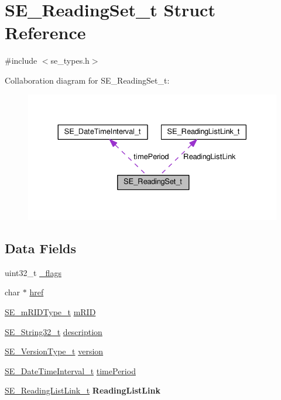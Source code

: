 \hypertarget{structSE__ReadingSet__t}{}\section{S\+E\+\_\+\+Reading\+Set\+\_\+t Struct Reference}
\label{structSE__ReadingSet__t}


{\ttfamily \#include $<$se\+\_\+types.\+h$>$}



Collaboration diagram for S\+E\+\_\+\+Reading\+Set\+\_\+t\+:\nopagebreak
\begin{figure}[H]
\begin{center}
\leavevmode
\includegraphics[width=330pt]{structSE__ReadingSet__t__coll__graph}
\end{center}
\end{figure}
\subsection*{Data Fields}
\begin{DoxyCompactItemize}
\item 
uint32\+\_\+t \hyperlink{group__ReadingSet_ga447ad86f7f9c278c2e3f166e89f6955c}{\+\_\+flags}
\item 
char $\ast$ \hyperlink{group__ReadingSet_gabdc2579f4df7fa4a87a23c41d057cf51}{href}
\item 
\hyperlink{group__mRIDType_gac74622112f3a388a2851b2289963ba5e}{S\+E\+\_\+m\+R\+I\+D\+Type\+\_\+t} \hyperlink{group__ReadingSet_gadeeb229d0f424fe8275177847d9764fb}{m\+R\+ID}
\item 
\hyperlink{group__String32_gac9f59b06b168b4d2e0d45ed41699af42}{S\+E\+\_\+\+String32\+\_\+t} \hyperlink{group__ReadingSet_gad67b558463072ec2819dd73f6ef2ee7b}{description}
\item 
\hyperlink{group__VersionType_ga4b8d27838226948397ed99f67d46e2ae}{S\+E\+\_\+\+Version\+Type\+\_\+t} \hyperlink{group__ReadingSet_gab59f9eff3274eb6686af1cb1165b18b0}{version}
\item 
\hyperlink{structSE__DateTimeInterval__t}{S\+E\+\_\+\+Date\+Time\+Interval\+\_\+t} \hyperlink{group__ReadingSet_gac688cdc34b6fb2eda9be0d9cd660f8ae}{time\+Period}
\item 
\hyperlink{structSE__ReadingListLink__t}{S\+E\+\_\+\+Reading\+List\+Link\+\_\+t} {\bfseries Reading\+List\+Link}
\end{DoxyCompactItemize}


